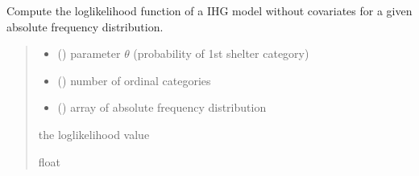 \documentclass[letterpaper,10pt,english]{sphinxmanual}
\begin{document}
\begin{fulllineitems}
\label{\detokenize{cubmods:cubmods.ihg.effe}}
\pysigstartsignatures
{}
\pysigstopsignatures
\sphinxAtStartPar
Compute the log\sphinxhyphen{}likelihood function of a IHG model without 
covariates for a given absolute frequency distribution.
\begin{quote}\begin{description}
\begin{itemize}
\item {} 
\sphinxAtStartPar
{} () \textendash{} parameter \(\theta\) (probability of 1st shelter category)

\item {} 
\sphinxAtStartPar
{} () \textendash{} number of ordinal categories

\item {} 
\sphinxAtStartPar
{} () \textendash{} array of absolute frequency distribution

\end{itemize}

\sphinxAtStartPar
the log\sphinxhyphen{}likelihood value

\sphinxAtStartPar
float

\end{description}\end{quote}

\end{fulllineitems}

\end{document}
